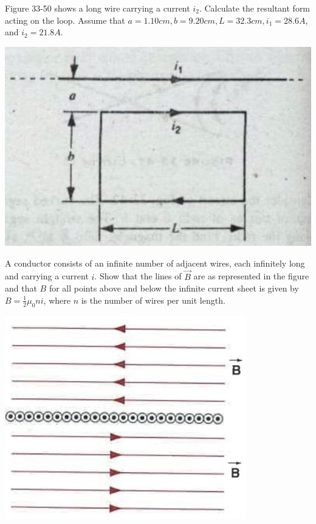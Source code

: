 \documentclass[11pt,letterpaper,boxed]{hmcpset}
\begin{document}
	\begin{problem}[HRK E33.24] Figure 33-50 shows a long wire carrying a current $i_2$. Calculate the resultant form acting on the loop. Assume that $a = 1.10 cm, b = 9.20 cm, L = 32.3 cm, i_1 = 28.6 A$, and $i_2 = 21.8A$.
				\begin{center}
		\includegraphics[scale=.3]{51m8pic4.jpg}
		\end{center}
	\end{problem}
	
	\begin{solution}
		\vfill
	\end{solution}
	\newpage
	
	\begin{problem}A conductor consists of an infinite number of adjacent wires, each infinitely long and carrying a current $i$. Show that the lines of $\vec{B}$ are as represented in the figure and that $B$ for all points above and below the infinite current sheet is given by $B = \frac{1}{2} \mu_0 ni$, where $n$ is the number of wires per unit length.
	\begin{center}
\includegraphics[scale=.3]{51m8pic5.jpg}
\end{center}		
	\end{problem}
	
\end{document}
